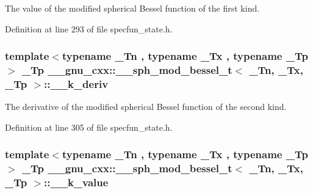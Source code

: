 The value of the modified spherical Bessel function of the first kind. 



Definition at line 293 of file specfun\+\_\+state.\+h.

\subsubsection[{\texorpdfstring{\+\_\+\+\_\+k\+\_\+deriv}{__k_deriv}}]{\setlength{\rightskip}{0pt plus 5cm}template$<$typename \+\_\+\+Tn , typename \+\_\+\+Tx , typename \+\_\+\+Tp $>$ \+\_\+\+Tp {\bf \+\_\+\+\_\+gnu\+\_\+cxx\+::\+\_\+\+\_\+sph\+\_\+mod\+\_\+bessel\+\_\+t}$<$ \+\_\+\+Tn, \+\_\+\+Tx, \+\_\+\+Tp $>$\+::\+\_\+\+\_\+k\+\_\+deriv}\hypertarget{struct____gnu__cxx_1_1____sph__mod__bessel__t_a4a291581457934e9d05c21e2acbedbc5}{}\label{struct____gnu__cxx_1_1____sph__mod__bessel__t_a4a291581457934e9d05c21e2acbedbc5}


The derivative of the modified spherical Bessel function of the second kind. 



Definition at line 305 of file specfun\+\_\+state.\+h.

\subsubsection[{\texorpdfstring{\+\_\+\+\_\+k\+\_\+value}{__k_value}}]{\setlength{\rightskip}{0pt plus 5cm}template$<$typename \+\_\+\+Tn , typename \+\_\+\+Tx , typename \+\_\+\+Tp $>$ \+\_\+\+Tp {\bf \+\_\+\+\_\+gnu\+\_\+cxx\+::\+\_\+\+\_\+sph\+\_\+mod\+\_\+bessel\+\_\+t}$<$ \+\_\+\+Tn, \+\_\+\+Tx, \+\_\+\+Tp $>$\+::\+\_\+\+\_\+k\+\_\+value}\hypertarget{struct____gnu__cxx_1_1____sph__mod__bessel__t_af0e430aef3e7053de5474206d6f13830}{}\label{struct____gnu__cxx_1_1____sph__mod__bessel__t_af0e430aef3e7053de5474206d6f13830}


